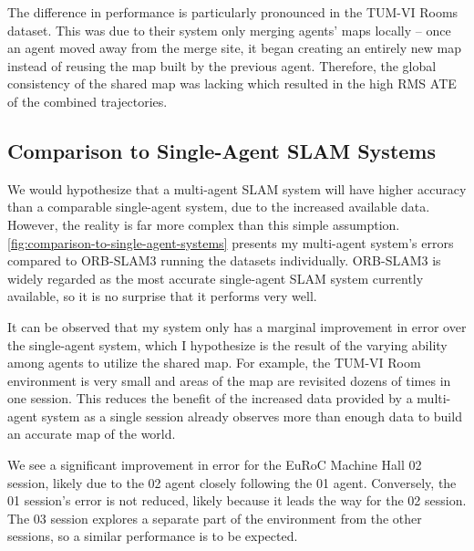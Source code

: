The difference in performance is particularly pronounced in the TUM-VI Rooms dataset. This was due to their system only merging agents' maps locally – once an agent moved away from the merge site, it began creating an entirely new map instead of reusing the map built by the previous agent. Therefore, the global consistency of the shared map was lacking which resulted in the high RMS ATE of the combined trajectories.

\subsection{Comparison to Single-Agent SLAM Systems}
We would hypothesize that a multi-agent SLAM system will have higher accuracy than a comparable single-agent system, due to the increased available data. However, the reality is far more complex than this simple assumption. \autoref{fig:comparison-to-single-agent-systems} presents my multi-agent system's errors compared to ORB-SLAM3 running the datasets individually. ORB-SLAM3 is widely regarded as the most accurate single-agent SLAM system currently available, so it is no surprise that it performs very well.

It can be observed that my system only has a marginal improvement in error over the single-agent system, which I hypothesize is the result of the varying ability among agents to utilize the shared map. For example, the TUM-VI Room environment is very small and areas of the map are revisited dozens of times in one session. This reduces the benefit of the increased data provided by a multi-agent system as a single session already observes more than enough data to build an accurate map of the world.

We see a significant improvement in error for the EuRoC Machine Hall 02 session, likely due to the 02 agent closely following the 01 agent. Conversely, the 01 session's error is not reduced, likely because it leads the way for the 02 session. The 03 session explores a separate part of the environment from the other sessions, so a similar performance is to be expected.

